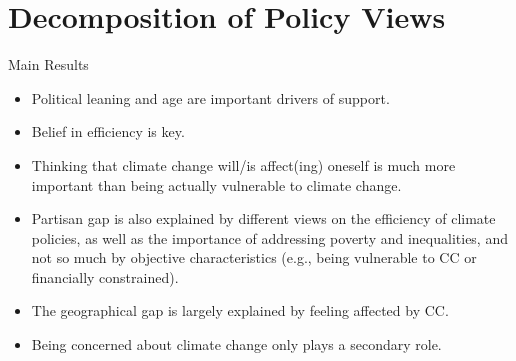 \begin{frame}{}%
\begin{table}[h!]
\begin{center}
\scalebox{.4}{}
\end{center}
\end{table}
\end{frame}

\begin{frame}{}%
\begin{table}[h!]
\begin{center}
\scalebox{.32}{}
\end{center}
\end{table}
\end{frame}

\section{Decomposition of Policy Views}


\begin{frame}{Main Results}
\begin{itemize}
	\item Political leaning and age are important drivers of support. \newline
	\item Belief in efficiency is key.
	\item Thinking that climate change will/is affect(ing) oneself is much more important than being actually vulnerable to climate change. \newline
	\item Partisan gap is also explained by different views on the efficiency of climate policies, as well as the importance of addressing poverty and inequalities, and not so much by objective characteristics (e.g., being vulnerable to CC or financially constrained).
	\item The geographical gap is largely explained by feeling affected by CC.
	\item Being concerned about climate change only plays a secondary role.
\end{itemize}
\end{frame}

